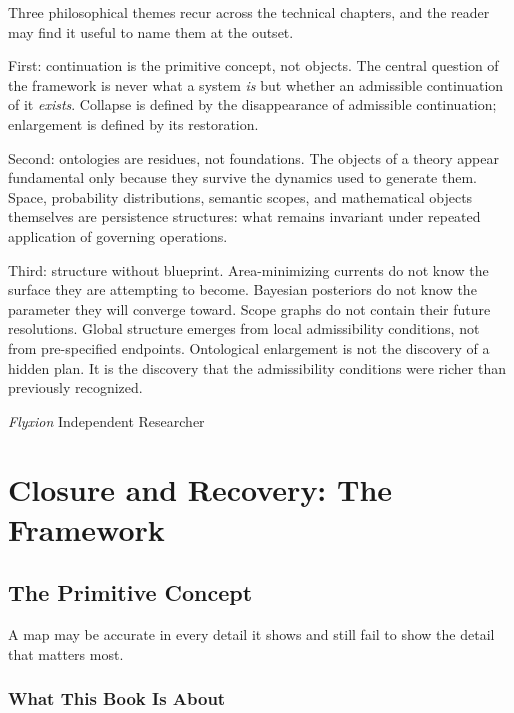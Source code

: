 \documentclass[12pt,oneside]{book}
\theoremstyle{plain}
\theoremstyle{definition}
\theoremstyle{remark}
\begin{document}
Three philosophical themes recur across the technical chapters, and the
reader may find it useful to name them at the outset.

First: continuation is the primitive concept, not objects. The central
question of the framework is never what a system \emph{is} but whether an
admissible continuation of it \emph{exists}. Collapse is defined by the
disappearance of admissible continuation; enlargement is defined by its
restoration.

Second: ontologies are residues, not foundations. The objects of a theory
appear fundamental only because they survive the dynamics used to generate
them. Space, probability distributions, semantic scopes, and mathematical
objects themselves are persistence structures: what remains invariant under
repeated application of governing operations.

Third: structure without blueprint. Area-minimizing currents do not know
the surface they are attempting to become. Bayesian posteriors do not know
the parameter they will converge toward. Scope graphs do not contain their
future resolutions. Global structure emerges from local admissibility
conditions, not from pre-specified endpoints. Ontological enlargement is
not the discovery of a hidden plan. It is the discovery that the admissibility
conditions were richer than previously recognized.

\vspace{1.2em}
\noindent\textit{Flyxion} \hfill Independent Researcher

\tableofcontents

\mainmatter

\part{Closure and Recovery: The Framework}

\chapter{The Primitive Concept}

\epigraph{A map may be accurate in every detail it shows and still fail to
show the detail that matters most.}{}

\section{What This Book Is About}
\end{document}
